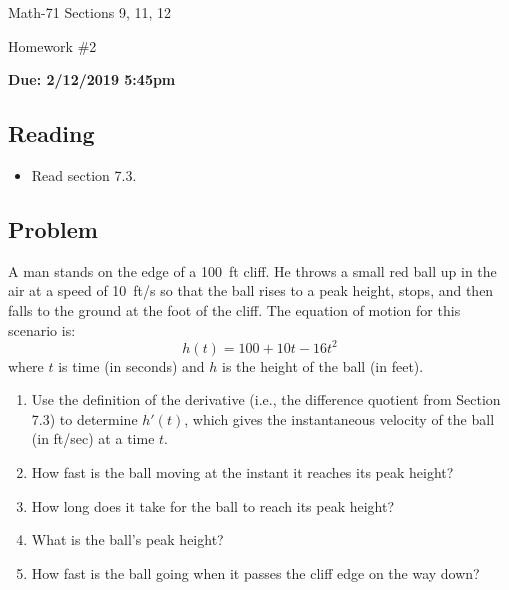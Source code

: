 \documentclass[letterpaper,12pt,fleqn]{article}
\begin{document}
\begin{center}
  \large
  Math-71 Sections 9, 11, 12

  \Large
  Homework \#2

  \large
  \textbf{Due: 2/12/2019 5:45pm}
\end{center}

\subsection*{Reading}

\begin{itemize}
\item Read section 7.3.
\end{itemize}

\subsection*{Problem}

A man stands on the edge of a \SI{100}{ft} cliff.  He throws a small red ball up in the air at a speed of \SI{10}{ft/s} so
that the ball rises to a peak height, stops, and then falls to the ground at the foot of the cliff.  The equation of motion
for this scenario is:
\[h(t)=100+10t-16t^2\]
where \(t\) is time (in seconds) and \(h\) is the height of the ball (in feet).
\begin{enumerate}
\item Use the definition of the derivative (i.e., the difference quotient from Section 7.3) to determine \(h'(t)\),
  which gives the instantaneous velocity of the ball (in ft/sec) at a time \(t\).
\item How fast is the ball moving at the instant it reaches its peak height?
\item How long does it take for the ball to reach its peak height?
\item What is the ball's peak height?
\item How fast is the ball going when it passes the cliff edge on the way down?
\end{enumerate}
\end{document}
